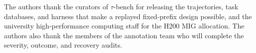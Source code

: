 \documentclass[a4paper,fleqn]{cas-sc}
\begin{document}
The authors thank the curators of $\tau$-bench for releasing the trajectories, task databases, and
harness that make a replayed fixed-prefix design possible, and the university high-performance
computing staff for the H200 MIG allocation. The authors also thank the members of the annotation
team who will complete the severity, outcome, and recovery audits. 
\sloppy
\setlength{\bibsep}{0pt}
\renewcommand{\bibfont}{\fontsize{8.5pt}{9pt}\selectfont}

 \vspace{4pt}
\end{document}
